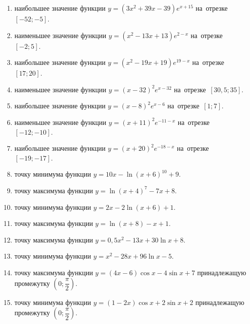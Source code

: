 \documentclass[a4paper,10pt]{article}
\begin{document}
\begin{enumerate}
\item {} наибольшее значение функции $y=\left(3x^2 +39x -39\right)e^{x+15}$ на~отрезке~$\left[-52;-5\right]$.

\item {} наименьшее значение функции $y=\left(x^2 -13x +13\right)e^{2-x}$ на~отрезке~$\left[-2;5\right]$.

\item {} наибольшее значение функции $y=\left(x^2 -19x +19\right)e^{19-x}$ на~отрезке~$\left[17;20\right]$.

\item {} наименьшее значение функции $y=\left(x-32\right)^2e^{x-32}$ на~отрезке~$\left[30,5;35\right]$.

\item {} наибольшее значение функции $y=\left(x-8\right)^2e^{x-6}$ на~отрезке~$\left[1;7\right]$.

\item {} наименьшее значение функции $y=\left(x+11\right)^2e^{-11-x}$ на~отрезке~$\left[-12;-10\right]$.

\item {} наибольшее значение функции $y=\left(x+20\right)^2e^{-18-x}$ на~отрезке~$\left[-19;-17\right]$.

\item {} точку минимума функции $y=10x-\ln\left(x+6\right)^{10}+9$.

\item {} точку максимума функции $y=\ln\left(x+4\right)^{7}-7x+8$.

\item {} точку минимума функции $y=2x-2\ln\left(x+6\right)+1$.

\item {} точку максимума функции $y=\ln\left(x+8\right)-x+1$.

\item {} точку максимума функции $y=0,5x^2-13x+30\ln x +8$.

\item {} точку минимума функции $y=x^2-28x+96\ln x -5$.

\item {} точку максимума функции $y=\left(4x-6\right)\cos x -4\sin x+7$
принадлежащую промежутку $\left(0;\dfrac{\pi}{2}\right)$.

\item {} точку минимума функции $y=\left(1-2x\right)\cos x +2\sin x+2$
принадлежащую промежутку $\left(0;\dfrac{\pi}{2}\right)$.


\end{enumerate}
\end{document}
